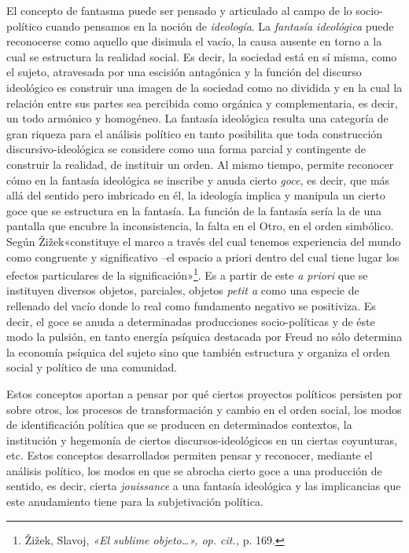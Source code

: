 El concepto de fantasma puede ser pensado y articulado al campo de lo socio-político cuando pensamos en la noción de \emph{ideología}. La \emph{fantasía ideológica} puede reconocerse como aquello que disimula el vacío, la causa ausente en torno a la cual se estructura la realidad social. Es decir, la sociedad está en sí misma, como el sujeto, atravesada por una escisión antagónica y la función del discurso ideológico es construir una imagen de la sociedad como no dividida y en la cual la relación entre sus partes sea percibida como orgánica y complementaria, es decir, un todo armónico y homogéneo. La fantasía ideológica resulta una categoría de gran riqueza para el análisis político en tanto posibilita que toda construcción discursivo-ideológica se considere como una forma parcial y contingente de construir la realidad, de instituir un orden. Al mismo tiempo, permite reconocer cómo en la fantasía ideológica se inscribe y anuda cierto \emph{goce,} es decir, que más allá del sentido pero imbricado en él, la ideología implica y manipula un cierto goce que se estructura en la fantasía. La función de la fantasía sería la de una pantalla que encubre la inconsistencia, la falta en el Otro, en el orden simbólico. Según Žižek«constituye el marco a través del cual tenemos experiencia del mundo como congruente y significativo --el espacio a priori dentro del cual tiene lugar los efectos particulares de la significación»\footnote{Žižek, Slavoj, \emph{«El sublime objeto\ldots», op. cit.,} p. 169.}. Es a partir de este \emph{a priori} que se instituyen diversos objetos, parciales, objetos \emph{petit a} como una especie de rellenado del vacío donde lo real como fundamento negativo se positiviza. Es decir, el goce se anuda a determinadas producciones socio-políticas y de éste modo la pulsión, en tanto energía psíquica destacada por Freud no sólo determina la economía psíquica del sujeto sino que también estructura y organiza el orden social y político de una comunidad.

Estos conceptos aportan a pensar por qué ciertos proyectos políticos persisten por sobre otros, los procesos de transformación y cambio en el orden social, los modos de identificación política que se producen en determinados contextos, la institución y hegemonía de ciertos discursos-ideológicos en un ciertas coyunturas, etc. Estos conceptos desarrollados permiten pensar y reconocer, mediante el análisis político, los modos en que se abrocha cierto goce a una producción de sentido, es decir, cierta \emph{jouissance} a una fantasía ideológica y las implicancias que este anudamiento tiene para la subjetivación política.

